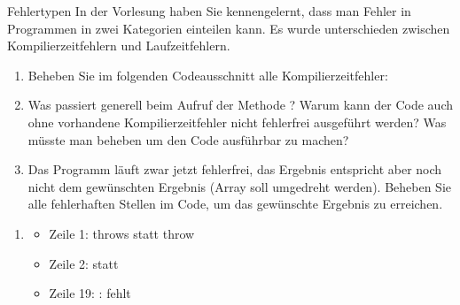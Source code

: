 \documentclass{../preamble}
\begin{document}
\begin{task}[credit = \stars{2}{3}]{Fehlertypen}
    In der Vorlesung haben Sie kennengelernt, dass man Fehler in Programmen in zwei Kategorien einteilen kann. Es wurde unterschieden zwischen Kompilierzeitfehlern und Laufzeitfehlern.
    \begin{enumerate}[label = (\arabic*)]
        \item Beheben Sie im folgenden Codeausschnitt alle Kompilierzeitfehler:
              
        \item Was passiert generell beim Aufruf der Methode ? Warum kann der Code auch ohne vorhandene Kompilierzeitfehler nicht fehlerfrei ausgeführt werden? Was müsste man beheben um den Code ausführbar zu machen?
        \item Das Programm läuft zwar jetzt fehlerfrei, das Ergebnis entspricht aber noch nicht dem gewünschten Ergebnis (Array soll umgedreht werden). Beheben Sie alle fehlerhaften Stellen im Code, um das gewünschte Ergebnis zu erreichen.
    \end{enumerate}

    \clearpage

    \begin{solution}
        \begin{enumerate}[label = (\arabic*)]
            \item\hfill
                  
                  \begin{itemize}
                      \item Zeile 1: \textcolor{keywordcolor}{throws} statt \textcolor{keywordcolor}{throw}
                      \item Zeile 2:  statt 
                      \item Zeile 19: :  fehlt
                  \end{itemize}

                  \clearpage


\end{enumerate}
\end{solution}
\end{task}
\end{document}
